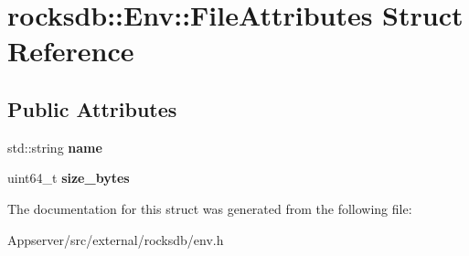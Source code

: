 \hypertarget{structrocksdb_1_1Env_1_1FileAttributes}{}\section{rocksdb\+:\+:Env\+:\+:File\+Attributes Struct Reference}
\label{structrocksdb_1_1Env_1_1FileAttributes}
\subsection*{Public Attributes}
\begin{DoxyCompactItemize}
\item 
std\+::string {\bfseries name}\hypertarget{structrocksdb_1_1Env_1_1FileAttributes_a5162ac457df2626f8aad0e2d088c5c46}{}\label{structrocksdb_1_1Env_1_1FileAttributes_a5162ac457df2626f8aad0e2d088c5c46}

\item 
uint64\+\_\+t {\bfseries size\+\_\+bytes}\hypertarget{structrocksdb_1_1Env_1_1FileAttributes_afd58487fad455d8bc93229fa52fca9c6}{}\label{structrocksdb_1_1Env_1_1FileAttributes_afd58487fad455d8bc93229fa52fca9c6}

\end{DoxyCompactItemize}


The documentation for this struct was generated from the following file\+:\begin{DoxyCompactItemize}
\item 
Appserver/src/external/rocksdb/env.\+h\end{DoxyCompactItemize}
